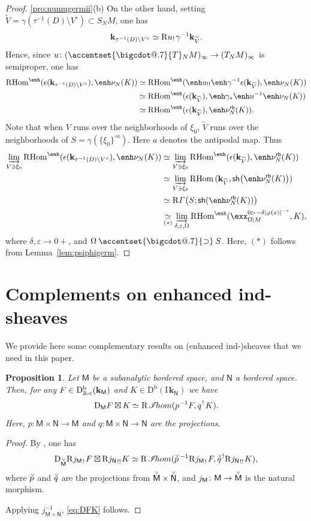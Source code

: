 \documentclass[JEP,XML,SOM,Unicode]{cedram}
\makeatletter
\let\mathcal\mathscr
\let\cl\colon
\newcommand*\bigcdot{\mathpalette\bigcdot@{.7}}
\newcommand*\bigcdot@[2]{\mathbin{\vcenter{\hbox{\scalebox{#2}{$\m@th#1\bullet$}}}}}
\newcommand{\bdot}[1]{{\accentset{\bigcdot}{#1}}\vphantom{#1}}
\newcommand{\dotsupset}{\mathbin{\bdot\supset}}
\newcommand{\bl}{\bigl(}
\newcommand{\br}{\bigr)}
\theoremstyle{plain}
\newtheorem{proposition}[theorem]{Proposition}
\theoremstyle{definition}
\newcommand{\R}{\mathbb{R}}
\newcommand{\derived}[1]{\mathrm{#1}}
\newcommand{\derd}{\derived{D}}
\newcommand{\derr}{\derived{R}}
\newcommand{\BDC}{\derd^{\mathrm{b}}}
\newcommand{\RHom}[1][]{\derr\mathrm{Hom}_{\raise1.5ex\hbox to.1em{}#1}}
\newcommand{\reim}[1]{\derr#1_{\mspace{.5mu}!}\mspace{2mu}}
\newcommand{\reeim}[1]{\derr#1_{\mspace{1mu}!!}\mspace{1mu}}
\newcommand{\FHom}{\RHom^\enh}
\newcommand{\rihom}{{\derr\mspace{2mu}\shi\!hom}}
\newcommand{\epb}[1]{#1^{\mspace{1.5mu}!}\mspace{2mu}}
\newcommand{\etens}[1][]{\mathbin{\boxtimes_{\raise1.5ex\hbox to-.1em{}#1}}}
\newcommand{\sheaffont}[1]{\mathcal{#1}}
\newcommand\shi{\sheaffont{I}}
\newcommand{\Eopb}[1]{\enh#1^{-1}}
\newcommand{\Eoim}[1]{\enh#1_*}
\newcommand{\Eeeim}[1]{\enh#1_{!!}}
\newcommand{\Enu}{\enh\nu}
\newcommand{\dual}{\mathrm{D}}
\newcommand{\Rc}{{\R\text-\mathrm{c}}}
\newcommand{\field}{\mathbf{k}}\let\cor\field
\newcommand{\ind}{\mathrm{I}\mspace{2mu}}
\newcommand{\ifield}{\ind\field}
\newcommand{\bclose}[1]{{\accentset{\vee}{#1}}}\let\cc\bclose
\newcommand{\inbordered}[1]{{#1_\infty}}
\let\inb \inbordered
\newcommand{\range}[2]{#1 \mathbin{\rhd} #2}
\newcommand{\rsect}{\derr\varGamma}
\newcommand{\rb}{\mathsf{rb}}
\newcommand{\sh}{\mathsf{sh}}
\newcommand{\bbM}{\mathsf{M}}
\newcommand{\cbM}{\bclose{\bbM}}
\newcommand{\bbN}{\mathsf{N}}
\newcommand{\cbN}{\bclose{\bbN}}
\newcommand{\ilim}[1][]{\mathop{\varinjlim}\limits_{#1}}
\newcommand{\opb}[1]{#1^{-1}}
\makeatother
\begin{document}
\begin{proof}
\eqref{pro:numugermii}(b)
On the other hand,
setting $\widetilde V = \gamma(\tau^{-1}(D)\setminus V^\circ)\subset S_NM$, one has
\[
\field_{\tau^{-1}(D)\setminus V^\circ} \simeq \reim u\opb\gamma\field_{\widetilde V}.
\]
Hence, since $u\colon\inb{(\bdot T_NM)}\to\inb{(T_NM)}$ is semiproper, one has
\begin{align*}
\FHom(\epsilon(\field_{\tau^{-1}(D)\setminus V^\circ}),\Enu_N(K))
&\simeq \FHom(\Eeeim u\Eopb\gamma \epsilon(\field_{\widetilde V}),\Enu_N(K)) \\
&\simeq \FHom(\epsilon(\field_{\widetilde V}),\Eoim\gamma\Eopb u\Enu_N(K)) \\
&\simeq \FHom(\epsilon(\field_{\widetilde V}),\Enu^\rb_N(K)).
\end{align*}
Note that when $V$ runs over the neighborhoods of $\xi_0$, $\widetilde V$ runs over the neighborhoods of $S=\gamma(\{\xi_0\}^{\circ a})$. Here $a$ denotes the antipodal map. Thus
\begin{align*}
\ilim[V\owns\xi_0] \FHom(\epsilon(\field_{\tau^{-1}(D)\setminus V^\circ}),\Enu_N(K))
&\simeq \ilim[V\owns\xi_0] \FHom(\epsilon(\field_{\widetilde V}),\Enu^\rb_N(K)) \\
&\simeq \ilim[V\owns\xi_0] \RHom(\field_{\widetilde V},\sh\bl\Enu^\rb_N(K)\br) \\
&\simeq \rsect\bl S;\sh(\Enu^\rb_N(K))\br \\
&\underset{(*)}\simeq \ilim[\delta,\varepsilon,\Omega]
\FHom( \exx^{\range0{-\delta|\varphi(x)|^{-\varepsilon}}}_{\Omega|M} , K),
\end{align*}
where $\delta,\varepsilon\to0+$, and $\Omega\dotsupset S$.
Here, $(*)$ follows from Lemma~\ref{lem:psiphigerm}.
\end{proof}

\appendix

\section{Complements on enhanced ind-sheaves}\label{se:compl}

We provide here some complementary results on (enhanced ind-)sheaves that we need in this paper.

\begin{proposition}
Let $\bbM$ be a subanalytic bordered space, and $\bbN$ a bordered space.
Then, for any $F\in\BDC_{\Rc}(\field_\bbM)$ and $K\in\BDC(\ifield_\bbN)$
we have
\begin{equation} \label{eq:DFK}
\dual_\bbM F\etens K\simeq \rihom
(\opb p F,\epb q K).
\end{equation}
Here, $p\cl \bbM\times\bbN\to\bbM$ and $q\cl\bbM\times\bbN\to\bbN$
are the projections.
\end{proposition}
\begin{proof}
By \cite[Prop.\,2.3.4]{DK16}, one has
\[
\dual_\cbM\reim{{j_\bbM}} F\etens \reeim{{j_\bbN}} K\simeq \rihom
(\cc p{}^{\,-1}\reim{{j_\bbM}} F,\cc q{}^{\,!}\reeim{{j_\bbN}} K),
\]
where $\cc p$ and $\cc q$ are the projections from $\cbM\times\cbN$, and $j_\bbM\colon\bbM\to\cbM$ is the natural morphism.

Applying $\opb j_{\bbM\times\bbN}$, \eqref{eq:DFK} follows.
\end{proof}
\end{document}
